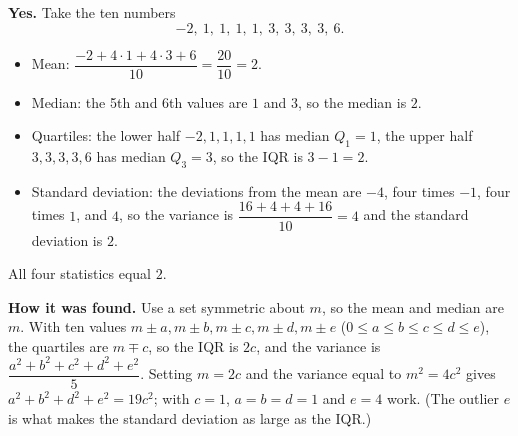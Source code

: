 \textbf{Yes.} Take the ten numbers
\[
-2,\ 1,\ 1,\ 1,\ 1,\ 3,\ 3,\ 3,\ 3,\ 6 .
\]
\begin{itemize}
\item Mean: $\dfrac{-2+4\cdot1+4\cdot3+6}{10}=\dfrac{20}{10}=2$.
\item Median: the 5th and 6th values are $1$ and $3$, so the median is $2$.
\item Quartiles: the lower half $-2,1,1,1,1$ has median $Q_1=1$, the upper half $3,3,3,3,6$ has median $Q_3=3$, so the IQR is $3-1=2$.
\item Standard deviation: the deviations from the mean are $-4$, four times $-1$, four times $1$, and $4$, so the variance is $\dfrac{16+4+4+16}{10}=4$ and the standard deviation is $2$.
\end{itemize}
All four statistics equal $\boxed{2}$.

\textbf{How it was found.} Use a set symmetric about $m$, so the mean and median are $m$. With ten values $m\pm a,m\pm b,m\pm c,m\pm d,m\pm e$ ($0\le a\le b\le c\le d\le e$), the quartiles are $m\mp c$, so the IQR is $2c$, and the variance is $\dfrac{a^2+b^2+c^2+d^2+e^2}{5}$. Setting $m=2c$ and the variance equal to $m^2=4c^2$ gives $a^2+b^2+d^2+e^2=19c^2$; with $c=1$, $a=b=d=1$ and $e=4$ work. (The outlier $e$ is what makes the standard deviation as large as the IQR.)
